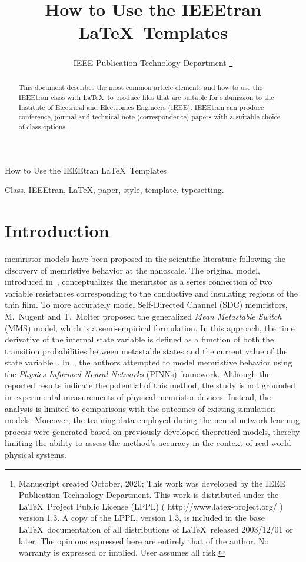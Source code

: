 \documentclass[lettersize,journal]{IEEEtran}
\begin{document}
\title{How to Use the IEEEtran \LaTeX \ Templates}
\author{IEEE Publication Technology Department
  \thanks{Manuscript created October, 2020; This work was developed by the IEEE Publication Technology Department. This work is distributed under the \LaTeX \ Project Public License (LPPL) ( http://www.latex-project.org/ ) version 1.3. A copy of the LPPL, version 1.3, is included in the base \LaTeX \ documentation of all distributions of \LaTeX \ released 2003/12/01 or later. The opinions expressed here are entirely that of the author. No warranty is expressed or implied. User assumes all risk.}}

%
{How to Use the IEEEtran \LaTeX \ Templates}

\maketitle

\begin{abstract}
  This document describes the most common article elements and how to use the IEEEtran class with \LaTeX \ to produce files that are suitable for submission to the Institute of Electrical and Electronics Engineers (IEEE).  IEEEtran can produce conference, journal and technical note (correspondence) papers with a suitable choice of class options.
\end{abstract}

\begin{IEEEkeywords}
  Class, IEEEtran, \LaTeX, paper, style, template, typesetting.
\end{IEEEkeywords}


\section{Introduction}
 memristor models have been proposed in the scientific literature following the discovery of memristive behavior at the nanoscale. The original model, introduced in~\cite{Strukov2008}, conceptualizes the memristor as a series connection of two variable resistances corresponding to the conductive and insulating regions of the thin film. To more accurately model Self-Directed Channel (SDC) memristors, M.~Nugent and T.~Molter proposed the generalized \textit{Mean Metastable Switch} (MMS) model, which is a semi-empirical formulation. In this approach, the time derivative of the internal state variable is defined as a function of both the transition probabilities between metastable states and the current value of the state variable~\cite{Molter2016}. In~\cite{Lee2024}, the authors attempted to model memristive behavior using the \textit{Physics-Informed Neural Networks} (PINNs) framework. Although the reported results indicate the potential of this method, the study is not grounded in experimental measurements of physical memristor devices. Instead, the analysis is limited to comparisons with the outcomes of existing simulation models. Moreover, the training data employed during the neural network learning process were generated based on previously developed theoretical models, thereby limiting the ability to assess the method's accuracy in the context of real-world physical systems.
\end{document}
